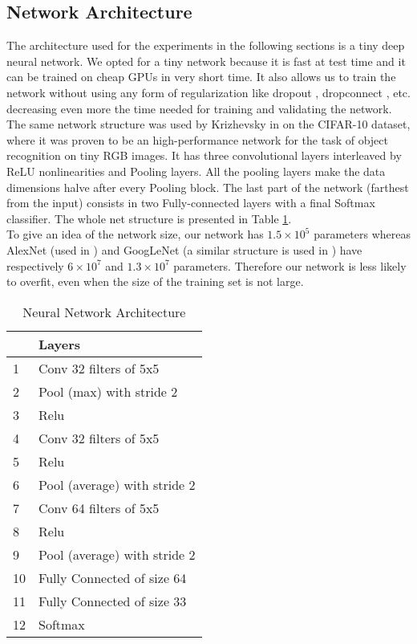 \documentclass[final,5p,twocolumn]{elsarticle}
\begin{document}
\subsection{Network Architecture}
\label{sec:architecture}
The architecture used for the experiments in the following sections is a tiny deep neural network. We opted for a tiny network because it is fast at test time and it can be trained on cheap GPUs in very short time. It also allows us to train the network without using any form of regularization like dropout \cite{srivastava2014dropout}, dropconnect \cite{wan2013regularization}, etc. decreasing even more the time needed for training and validating the network.\\
The same network structure was used by Krizhevsky in \cite{krizhevsky2012imagenet} on the CIFAR-10 dataset, where it was proven to be an high-performance network for the task of object recognition on tiny RGB images. It has three convolutional layers interleaved by ReLU nonlinearities and Pooling layers. All the pooling layers make the data dimensions halve after every Pooling block. The last part of the network (farthest from the input) consists in two Fully-connected layers with a final Softmax classifier. The whole net structure is presented in Table \ref{tab:net_architecture}.\\
To give an idea of the network size, our network has $1.5 \times 10^5$ parameters whereas AlexNet (used in \cite{eggert2015benefit}) and GoogLeNet (a similar structure is used in \cite{iandola2015deeplogo}) have respectively $6 \times 10^7$ and $1.3 \times 10^7$ parameters. Therefore our network is less likely to overfit, even when the size of the training set is not large.

\begin{table}[htbpp]
	\caption{Neural Network Architecture}
	\label{tab:net_architecture}
	\center
\begin{tabular}{ll}
\toprule
 & \textbf{Layers}\\ \midrule
1 & Conv 32 filters of 5x5\\
2 & Pool (max) with stride 2\\
3 & Relu\\
4 & Conv 32 filters of 5x5\\
5 & Relu\\
6 & Pool (average) with stride 2\\
7 & Conv 64 filters of 5x5\\
8 & Relu\\
9 & Pool (average) with stride 2\\
10 & Fully Connected of size 64 \\
11 & Fully Connected of size 33 \\
12 & Softmax\\ \bottomrule
\end{tabular}
\end{table}
\end{document}
